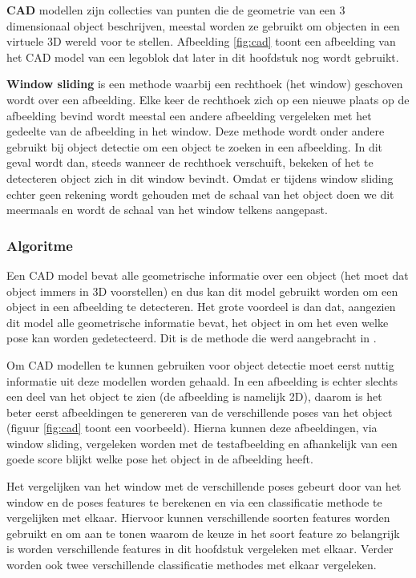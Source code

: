 \textbf{CAD} modellen zijn collecties van punten die de geometrie van een 3 dimensionaal object beschrijven, meestal worden ze gebruikt om objecten in een virtuele 3D wereld voor te stellen. Afbeelding \ref{fig:cad} toont een afbeelding van het CAD model van een legoblok dat later in dit hoofdstuk nog wordt gebruikt.

\textbf{Window sliding} is een methode waarbij een rechthoek (het window) geschoven wordt over een afbeelding. Elke keer de rechthoek zich op een nieuwe plaats op de afbeelding bevind wordt meestal een andere afbeelding vergeleken met het gedeelte van de afbeelding in het window. Deze methode wordt onder andere gebruikt bij object detectie om een object te zoeken in een afbeelding. In dit geval wordt dan, steeds wanneer de rechthoek verschuift, bekeken of het te detecteren object zich in dit window bevindt. Omdat er tijdens window sliding echter geen rekening wordt gehouden met de schaal van het object doen we dit meermaals en wordt de schaal van het window telkens aangepast.

\subsubsection*{Algoritme}
Een CAD model bevat alle geometrische informatie over een object (het moet dat object immers in 3D voorstellen) en dus kan dit model gebruikt worden om een object in een afbeelding te detecteren. Het grote voordeel is dan dat, aangezien dit model alle geometrische informatie bevat, het object in om het even welke pose kan worden gedetecteerd. Dit is de methode die werd aangebracht in \cite{aubry2014seeing}.

Om CAD modellen te kunnen gebruiken voor object detectie moet eerst nuttig informatie uit deze modellen worden gehaald. In een afbeelding is echter slechts een deel van het object te zien (de afbeelding is namelijk 2D),  daarom is het beter eerst afbeeldingen te genereren van de verschillende poses van het object (figuur \ref{fig:cad} toont een voorbeeld). Hierna kunnen deze afbeeldingen, via window sliding, vergeleken worden met de testafbeelding en afhankelijk van een goede score blijkt welke pose het object in de afbeelding heeft.

Het vergelijken van het window met de verschillende poses gebeurt door van het window en de poses features te berekenen en via een classificatie methode te vergelijken met elkaar. Hiervoor kunnen verschillende soorten features worden gebruikt en om aan te tonen waarom de keuze in het soort feature zo belangrijk is worden verschillende features in dit hoofdstuk vergeleken met elkaar. Verder worden ook twee verschillende classificatie methodes met elkaar vergeleken.


